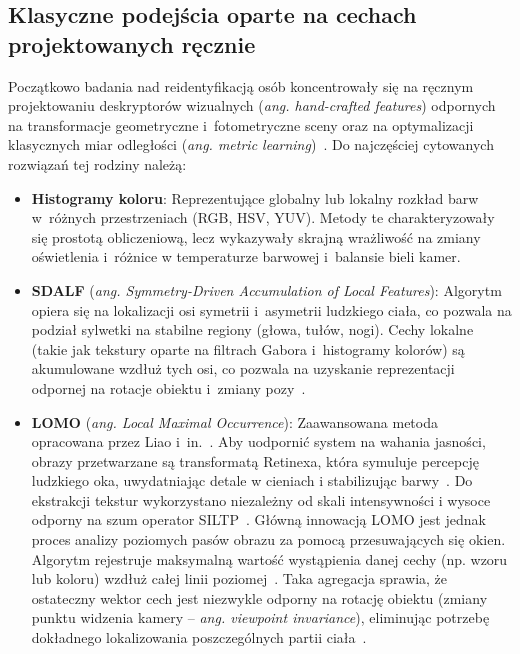 \subsection{Klasyczne podejścia oparte na cechach projektowanych ręcznie}
\label{subsec:hand_crafted_reid}

Początkowo badania nad reidentyfikacją osób koncentrowały się na ręcznym projektowaniu deskryptorów
wizualnych (\textit{ang. hand-crafted features}) odpornych na transformacje geometryczne
i~fotometryczne sceny oraz na optymalizacji klasycznych miar odległości (\textit{ang. metric
  learning})~\cite{zheng2016person}. Do najczęściej cytowanych rozwiązań tej rodziny należą:
\begin{itemize}
  \item \textbf{Histogramy koloru}: Reprezentujące globalny lub lokalny rozkład barw w~różnych przestrzeniach (RGB, HSV, YUV). Metody te charakteryzowały się prostotą obliczeniową, lecz wykazywały skrajną wrażliwość na zmiany oświetlenia i~różnice w temperaturze barwowej i~balansie bieli kamer.
  \item \textbf{SDALF} (\textit{ang. Symmetry-Driven Accumulation of Local Features}): Algorytm opiera się na lokalizacji osi symetrii i~asymetrii ludzkiego ciała, co pozwala na podział sylwetki na stabilne regiony (głowa, tułów, nogi). Cechy lokalne (takie jak tekstury oparte na filtrach Gabora i~histogramy kolorów) są akumulowane wzdłuż tych osi, co pozwala na uzyskanie reprezentacji odpornej na rotacje obiektu i~zmiany pozy~\cite{farenzena2010person}.
  \item \textbf{LOMO} (\textit{ang. Local Maximal Occurrence}): Zaawansowana metoda opracowana przez Liao i~in.~\cite{liao2015}. Aby uodpornić system na wahania jasności, obrazy przetwarzane są transformatą Retinexa, która symuluje percepcję ludzkiego oka, uwydatniając detale w cieniach i stabilizując barwy~\cite{liao2015}. Do ekstrakcji tekstur wykorzystano niezależny od skali intensywności i wysoce odporny na szum operator SILTP~\cite{liao2015}. Główną innowacją LOMO jest jednak proces analizy poziomych pasów obrazu za pomocą przesuwających się okien. Algorytm rejestruje maksymalną wartość wystąpienia danej cechy (np. wzoru lub koloru) wzdłuż całej linii poziomej~\cite{liao2015}. Taka agregacja sprawia, że ostateczny wektor cech jest niezwykle odporny na rotację obiektu (zmiany punktu widzenia kamery – \textit{ang. viewpoint invariance}), eliminując potrzebę dokładnego lokalizowania poszczególnych partii ciała~\cite{liao2015}.
\end{itemize}


